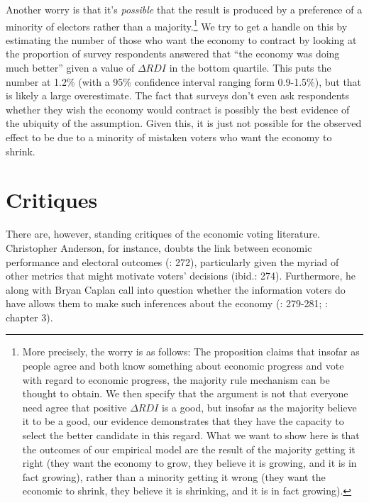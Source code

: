 \documentclass[11pt]{article}
\begin{document}
Another worry is that it's \emph{possible} that the result is produced by a preference of a minority of electors rather than a majority.\footnote{More precisely, the worry is as follows: The proposition claims that insofar as people agree and both know something about economic progress and vote with regard to economic progress, the majority rule mechanism can be thought to obtain. We then specify that the argument is not that everyone need agree that positive $\Delta RDI$ is a good, but insofar as the majority believe it to be a good, our evidence demonstrates that they have the capacity to select the better candidate in this regard. What we want to show here is that the outcomes of our empirical model are the result of the majority getting it right (they want the economy to grow,  they believe it is growing, and it is in fact growing), rather than a minority getting it wrong (they want the economic to shrink, they believe it is shrinking, and it is in fact growing).} We try to get a handle on this by estimating the number of those who want the economy to contract by looking at the proportion of survey respondents answered  that ``the economy was doing much better'' given a value of $\Delta RDI$ in the bottom quartile. This puts the number at 1.2\% (with a 95\% confidence interval ranging form 0.9-1.5\%), but that is likely a large overestimate. %
The fact that surveys don't even ask respondents whether they wish the economy would contract is possibly the best evidence of the ubiquity of the assumption. Given this, it is just not possible for the observed effect to be due to a minority of mistaken voters who want the economy to shrink. 


\section{Critiques}

There are, however, standing critiques of the economic voting literature.  Christopher Anderson, for instance, doubts the link between economic performance and electoral outcomes (\cite{Anderson07}: 272), particularly given the myriad of other metrics that might motivate voters' decisions (ibid.: 274). Furthermore, he along with Bryan Caplan call into question whether the information voters do have allows them to make such inferences about the economy (\cite{Anderson07}: 279-281; \cite{Caplan2006}: chapter 3).
\end{document}
